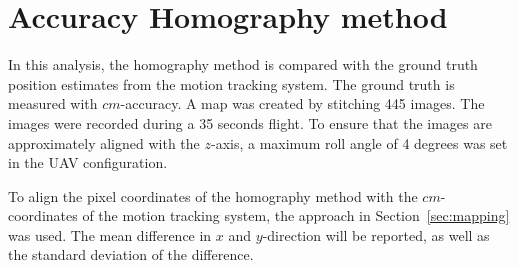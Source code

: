 \section{Accuracy Homography method}
\label{sec:siftvsoptitrack}

In this analysis, the homography method is compared with the ground truth position estimates from the motion tracking system. The ground truth is measured with $cm$-accuracy. A map was created by stitching 445 images. The images were recorded during a 35 seconds flight. To ensure that the images are approximately aligned with the $z$-axis, a maximum roll angle of 4 degrees was set in the UAV configuration. 

To align the pixel coordinates of the homography method with the $cm$-coordinates of the motion tracking system, the approach in Section~\ref{sec:mapping} was used. The mean difference in $x$ and $y$-direction will be reported, as well as the standard deviation of the difference. 

